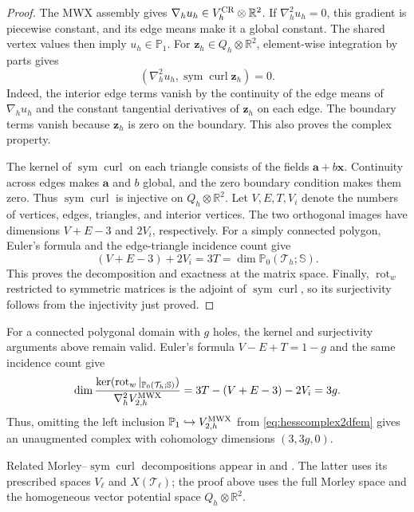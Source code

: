 \documentclass[10pt]{amsart}
\numberwithin{equation}{section}
\newcommand{\curl}{\operatorname{curl}}
\newcommand{\rot}{\operatorname{rot}}
\newcommand{\sym}{\operatorname{sym}}
\begin{document}
\begin{proof}
The MWX assembly gives $\nabla_hu_h\in V_h^{\rm CR}\otimes\mathbb R^2$.
If $\nabla_h^2u_h=0$, this gradient is piecewise constant, and its edge means
make it a global constant. The shared vertex values then imply
$u_h\in\mathbb P_1$.
For $\boldsymbol z_h\in Q_h\otimes\mathbb R^2$, element-wise integration
by parts gives
\[
(\nabla_h^2u_h,\sym\curl\boldsymbol z_h)=0.
\]
Indeed, the interior edge terms vanish by the continuity of the edge means
of $\nabla_hu_h$ and the constant tangential derivatives of
$\boldsymbol z_h$ on each edge. The boundary terms vanish because
$\boldsymbol z_h$ is zero on the boundary. This also proves the complex property.

The kernel of $\sym\curl$ on each triangle consists of the fields
$\boldsymbol a+b\boldsymbol x$. Continuity across edges makes
$\boldsymbol a$ and $b$ global, and the zero boundary condition makes them
zero. Thus $\sym\curl$ is injective on $Q_h\otimes\mathbb R^2$.
Let $V,E,T,V_i$ denote the numbers of vertices, edges, triangles, and
interior vertices. The two orthogonal images have dimensions $V+E-3$
and $2V_i$, respectively. For a simply connected polygon, Euler's formula
and the edge-triangle incidence count give
\[
(V+E-3)+2V_i=3T=\dim\mathbb P_0(\mathcal T_h;\mathbb S).
\]
This proves the decomposition and exactness at the matrix space.
Finally, $\rot_w$ restricted to symmetric matrices is the adjoint of
$\sym\curl$, so its surjectivity follows from the injectivity just proved.
\end{proof}
For a connected polygonal domain with $g$ holes, the kernel and
surjectivity arguments above remain valid. Euler's formula
$V-E+T=1-g$ and the same incidence count give
\[
\dim
\frac{\ker(\rot_w|_{\mathbb P_0(\mathcal T_h;\mathbb S)})}
{\nabla_h^2V_{2,h}^{\rm MWX}}
=3T-(V+E-3)-2V_i=3g.
\]
Thus, omitting the left inclusion
$\mathbb P_1\hookrightarrow V_{2,h}^{\rm MWX}$ from
\eqref{eq:hesscomplex2dfem} gives an unaugmented complex with
cohomology dimensions $(3,3g,0)$.

Related Morley--$\sym\curl$ decompositions appear in
\cite[Theorem 3.1]{CarstensenGallistlHu2014} and
\cite[Theorem 4.5]{Gallistl2015}. The latter uses its prescribed spaces
$V_\ell$ and $X(\mathcal T_\ell)$; the proof above uses the full Morley
space and the homogeneous vector potential space $Q_h\otimes\mathbb R^2$.
\end{document}
